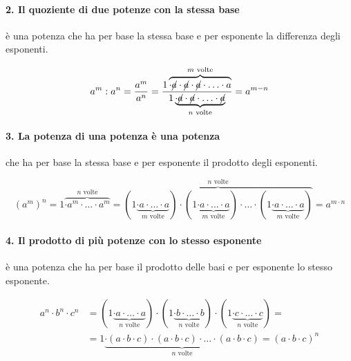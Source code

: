 \vspace{-1.5em}
\paragraph{2. Il quoziente di due potenze con la stessa base} 
è una potenza che ha per base la stessa base e per esponente la differenza 
degli esponenti.

\[
a^m: a^n = \frac{a^m}{a^n}=
\frac{1 \overbrace{\cdot \cancel{a} \cdot \cancel{a} \cdot \cancel{a} \cdot 
                \ldots \cdot a}^{m \text{ volte}}}
{1 \underbrace{\cdot \cancel{a} \cdot \cancel{a} \cdot
                \ldots \cdot \cancel{a}}_{n \text{ volte}}}=
a^{m-n}
\]

\vspace{-1.5em}
\paragraph{3. La potenza di una potenza è una potenza} 
che ha per base la stessa base e per esponente il prodotto degli esponenti.

\[(a^m)^n =
1 \overbrace{\cdot a^m\cdot \ldots\cdot a^m}^{n\text{ volte}}%
 =\overbrace{(1 \underbrace{\cdot a\cdot \ldots\cdot a}_{m\text{ 
volte}})\cdot%
   (1 \underbrace{\cdot a\cdot \ldots\cdot a}_{m\text{ 
volte}})\cdot\ldots\cdot%
   (1 \underbrace{\cdot a\cdot \ldots\cdot a}_{m\text{ 
volte}})}^{n\text{ volte}}%
   =a^{m\cdot n}\]

\vspace{-1.5em}
\paragraph{4. Il prodotto di più potenze con lo stesso esponente} 
è una potenza che ha per base il prodotto delle basi e per esponente 
lo stesso esponente.

\begin{align*}
a^n \cdot b^n \cdot c^n &=
  (1 \underbrace{\cdot a \cdot \ldots \cdot a}_{n\text{ volte}}) \cdot
  (1 \underbrace{\cdot b \cdot \ldots \cdot b}_{n\text{ volte}}) \cdot
  (1 \underbrace{\cdot c \cdot \ldots \cdot c}_{n\text{ volte}}) =\\
&=
  1 \underbrace{\cdot (a \cdot b \cdot c) \cdot (a \cdot b \cdot c) \cdot
              \ldots \cdot (a \cdot b \cdot c)}_{n\text{ volte}}=
   (a \cdot b \cdot c)^n
\end{align*}

